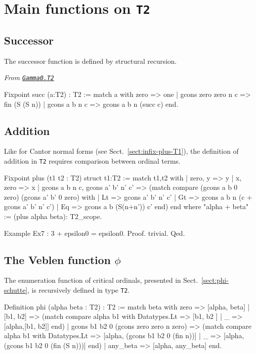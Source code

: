 {\section{Main functions on \texttt{T2}}

\subsection{Successor}
The successor function is defined by structural recursion.

\noindent\emph{From \href{../theories/html/hydras.Gamma0.T2.html\#succ}%
{\texttt{Gamma0.T2}}}
\begin{Coqsrc}
Fixpoint succ (a:T2) : T2 :=
 match a with zero => one
             | gcons zero zero n c => fin (S (S n))
             | gcons a b n c => gcons a b n (succ c)
 end.
\end{Coqsrc}

\subsection{Addition}

Like for Cantor normal forms (see Sect.~\ref{sect:infix-plus-T1}),  the definition of addition in \texttt{T2}  requires comparison between ordinal terms.


\begin{Coqsrc}
Fixpoint plus (t1 t2 : T2) {struct t1}:T2 :=
  match t1,t2 with
  |  zero, y  => y
  |  x, zero => x
  |  gcons a b n c, gcons a' b' n' c' =>
     (match compare (gcons a b 0 zero)
                    (gcons a' b' 0 zero) with
      | Lt => gcons a' b' n' c'
      | Gt => gcons a b n (c + gcons a' b' n' c')
      | Eq => gcons a b (S(n+n')) c'
      end)
  end
where "alpha + beta" := (plus alpha beta): T2_scope.
\end{Coqsrc}

\begin{Coqsrc}
Example Ex7 : 3 + epsilon0 = epsilon0.
Proof. trivial. Qed.
\end{Coqsrc}

\subsection{The Veblen function \texorpdfstring{$\phi$}{\texttt{phi}}}

The enumeration function of critical ordinals, presented in Sect.~\vref{sect:phi-schutte}, is recursively defined in type \texttt{T2}.

\begin{Coqsrc}
Definition  phi (alpha beta : T2) : T2 :=
  match beta with zero => [alpha, beta] 
             | [b1, b2] => 
               (match compare alpha b1
                with Datatypes.Lt => [b1, b2 ]
                | _ => [alpha,[b1, b2]]
                end)
             | gcons b1 b2 0 (gcons zero zero  n zero) => 
               (match compare alpha b1
                with  Datatypes.Lt => 
                      [alpha, (gcons b1 b2 0 (fin n))]
                | _ =>  [alpha, (gcons b1 b2 0 (fin (S n)))]
                end)
             | any_beta => [alpha, any_beta]
  end.
\end{Coqsrc}

}
